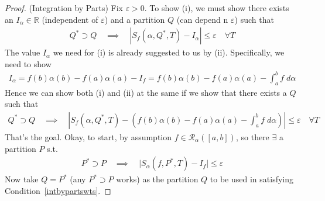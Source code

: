 \documentclass[12pt]{article}
\numberwithin{equation}{section} %
\theoremstyle{plain}
\theoremstyle{definition}
\theoremstyle{remark}
\newcommand{\sR}{\mathscr{R}}
\newcommand{\R}{\mathbb{R}}
\begin{document}
\begin{proof}(Integration by Parts)
Fix $\varepsilon>0$. To show (i), we must show there exists an
$I_\alpha\in\R$ (independent of $\varepsilon$) and a partition $Q$ (can
depend n $\varepsilon$) such that
\begin{align}
  Q^*\supset Q\quad\implies\quad
  |S_f(\alpha,Q^*,T)-I_\alpha|\leq\varepsilon
  \quad \forall T
  \label{intbypartscond}
\end{align}
The value $I_\alpha$ we need for (i) is already suggested to us by (ii).
Specifically, we need to show
\begin{align*}
  I_\alpha
  = f(b)\alpha(b)-f(a)\alpha(a)-I_f
  = f(b)\alpha(b)-f(a)\alpha(a)-\int^b_af\;d\alpha
\end{align*}
Hence we can show both (i) and (ii) at the same if we show that
there exists a $Q$ such that
\begin{align}
  Q^*\supset Q\quad\implies\quad
  \left\lvert
    S_f(\alpha,Q^*,T)-
    \left(
    f(b)\alpha(b)-f(a)\alpha(a)
    - \int^b_a f\; d\alpha
  \right)
  \right\rvert
  \leq\varepsilon
  \quad \forall T
  \label{intbypartswts}
\end{align}
That's the goal. Okay, to start, by assumption $f\in\sR_\alpha([a,b])$,
so there $\exists$ a partition $P$ s.t.
\begin{align}
  P^*\supset P\quad\implies\quad
  \lvert S_\alpha(f,P^*,T) - I_f \rvert \leq \varepsilon
  \label{intbypartscond2}
\end{align}
Now take $Q=P^*$ (any $P^*\supset P$ works) as the partition $Q$ to be
used in satisfying Condition~\ref{intbypartswts}.


\end{proof}
\end{document}
